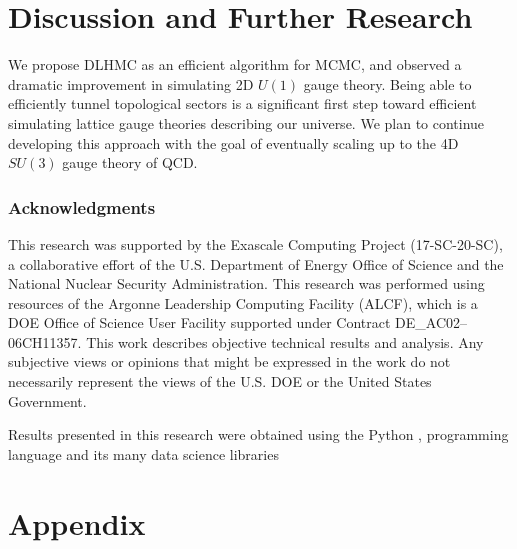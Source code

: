 \documentclass{article} %
\begin{document}
\section{Discussion and Further Research}
We propose DLHMC as an efficient algorithm for MCMC, and observed a dramatic improvement
in simulating 2D $U(1)$ gauge theory.
Being able to efficiently tunnel topological sectors is a significant first step toward efficient
simulating lattice gauge theories describing our universe.
%
We plan to continue developing this approach with the goal of eventually scaling up to the 4D \(SU(3)\) gauge theory of QCD.
%
\subsubsection*{Acknowledgments}
This research was supported by the Exascale Computing Project (17-SC-20-SC), a collaborative effort of the U.S. Department of Energy Office of Science and the National Nuclear Security Administration.
This research was performed using resources of the Argonne Leadership Computing Facility (ALCF), which is a DOE Office of Science User
Facility supported under Contract DE\_AC02--06CH11357. 
%
This work describes objective technical results and analysis.
%
Any subjective views or opinions that might be expressed in the work do not necessarily represent the views of the U.S.
DOE or the United States Government.
%

Results presented in this research were obtained using the Python \citep{van1995python}, programming language and its many data science libraries \citep{matplotlib,numpyharris2020array,tensorflow2015-whitepaper,seaborn_michael_waskom_2017_883859,ipython4160251}




\appendix
\section{Appendix}
%
\end{document}
